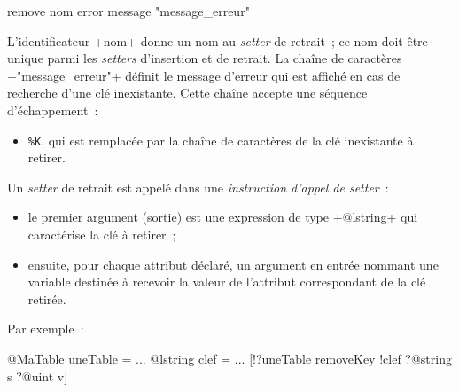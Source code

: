 \begin{galgas3}
remove nom error message "message_erreur"
\end{galgas3}

L'identificateur \ggst+nom+ donne un nom au \emph{setter} de retrait~; ce nom doit être unique parmi les \emph{setters} d'insertion et de retrait. La chaîne de caractères \ggst+"message_erreur"+ définit le message d'erreur qui est affiché en cas de recherche d'une clé inexistante. Cette chaîne accepte une séquence d'échappement~:
\begin{itemize}
  \item \texttt{\%K}, qui est remplacée par la chaîne de caractères de la clé inexistante à retirer.
\end{itemize}


Un \emph{setter} de retrait est appelé dans une \emph{instruction d'appel de setter}~:
\begin{itemize}
  \item le premier argument (sortie) est une expression de type \ggst+@lstring+ qui caractérise la clé à retirer~;
  \item ensuite, pour chaque attribut déclaré, un argument en entrée nommant une variable destinée à recevoir la valeur de l'attribut correspondant de la clé retirée.
\end{itemize}

Par exemple~:
\begin{galgas3}
@MaTable uneTable = {}
...
@lstring clef = ...
[!?uneTable removeKey !clef ?@string s ?@uint v]
\end{galgas3}


%
%

